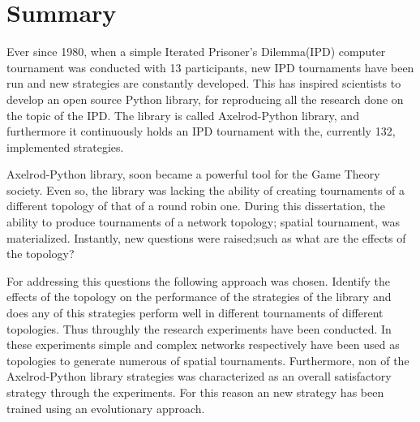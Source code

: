 \chapter{Summary}

Ever since 1980, when a simple Iterated Prisoner's Dilemma(IPD) computer
tournament was conducted with 13 participants, new IPD tournaments have been run
and new strategies are constantly developed. This has inspired scientists to develop
an open source Python library, for reproducing all the research done on the topic
of the IPD. The library is called Axelrod-Python library, and furthermore it continuously holds
an IPD tournament with the, currently 132, implemented strategies.

Axelrod-Python library, soon became a powerful tool for the Game Theory society.
Even so, the library was lacking the ability of creating tournaments of a different
topology of that of a round robin one. During this dissertation, the ability to
produce tournaments of a network topology; spatial tournament, was materialized.
Instantly, new questions were raised;such as what are the effects of the topology?

For addressing this questions the following approach was chosen. Identify the
effects of the topology on the performance of the strategies of the library and
does any of this strategies perform well in different tournaments of different
topologies. Thus throughly the research experiments have been conducted. In these
experiments simple and complex networks respectively have been used as topologies
to generate numerous of spatial tournaments. Furthermore, non of the
Axelrod-Python library strategies was characterized as an overall satisfactory
strategy through the experiments. For this reason an new strategy has been trained
using an evolutionary approach.
